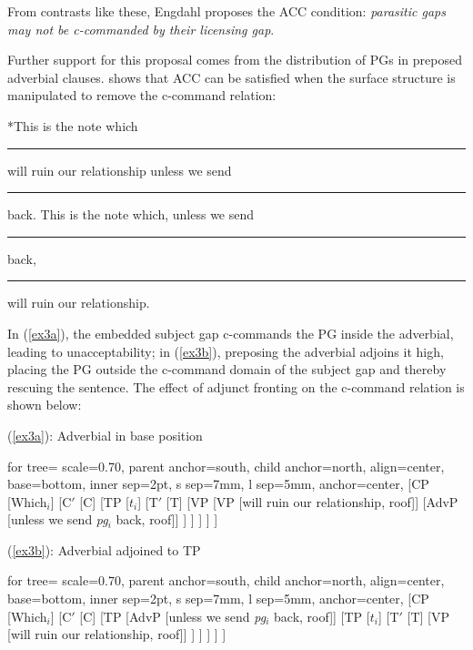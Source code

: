 \documentclass[12pt]{article}
\newcommand{\gap}{\rule{1.25em}{.5pt}} %
\newcommand{\TwoTreeCols}[2]{%
  \noindent\parbox[t]{0.47\linewidth}{#1}%
  \hspace{1.2em}%
  \parbox[t]{0.47\linewidth}{#2}\par
}
\begin{document}
\vspace{\baselineskip}

\noindent From contrasts like these, Engdahl proposes the ACC condition: \textit{parasitic gaps may not be c-commanded by their licensing gap}.

Further support for this proposal comes from the distribution of PGs in preposed adverbial clauses. \citet{haegeman1984} shows that ACC can be satisfied when the surface structure is manipulated to remove the c-command relation:

\pex \label{ex3}
\a \label{ex3a} *This is the note which \gap{} will ruin our relationship unless we send \gap{} back.
\a \label{ex3b} This is the note which, unless we send \gap{} back, \gap{} will ruin our relationship.
\xe

In (\ref{ex3a}), the embedded subject gap c-commands the PG inside the adverbial, leading to unacceptability; in (\ref{ex3b}), preposing the adverbial adjoins it high, placing the PG outside the c-command domain of the subject gap and thereby rescuing the sentence. The effect of adjunct fronting on the c-command relation is shown below:

\vspace{\baselineskip}

\TwoTreeCols
{%
  (\ref{ex3a}): Adverbial in base position%

  \vspace{0.6\baselineskip}
  \centering
  \begin{forest}
  for tree={
    scale=0.70,
    parent anchor=south,
    child anchor=north,
    align=center,
    base=bottom,
    inner sep=2pt,
    s sep=7mm,
    l sep=5mm,
    anchor=center,
  }
  [CP
    [{Which$_i$}]
    [C$'$
      [C]
      [TP
        [$t_i$]
        [T$'$
          [T]
          [VP
            [VP [{will ruin our relationship}, roof]]
            [AdvP [{unless we send \textit{pg}$_i$ back}, roof]]
          ]
        ]
      ]
    ]
  ]
  \end{forest}
}
{%
  (\ref{ex3b}): Adverbial adjoined to TP%

  \vspace{0.6\baselineskip}
  \centering
  \begin{forest}
  for tree={
    scale=0.70,
    parent anchor=south,
    child anchor=north,
    align=center,
    base=bottom,
    inner sep=2pt,
    s sep=7mm,
    l sep=5mm,
    anchor=center,
  }
  [CP
    [{Which$_i$}]
    [C$'$
      [C]
      [TP
        [AdvP [{unless we send \textit{pg}$_i$ back}, roof]]
        [TP
          [$t_i$]
          [T$'$
            [T]
            [VP [{will ruin our relationship}, roof]]
          ]
        ]
      ]
    ]
  ]
  \end{forest}
}
\end{document}
